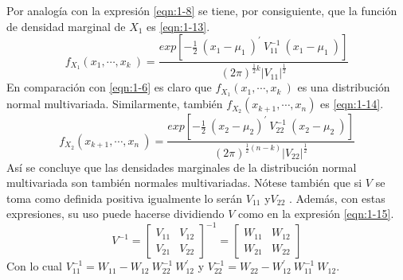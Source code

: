 Por analogía con la expresión \ref{eqn:1-8} se tiene, por consiguiente, que la función de densidad marginal de   $X_1$ es  \ref{eqn:1-13}.
\begin{equation}
f_{X_1}(x_1,\cdots,x_k\ )=\frac{exp[-\frac{1}{2}\ (x_1-\mu_1\ )^\prime\ V_{11}^{-1}\ (x_1-\mu_1\ )]}{(2\pi)^{\frac{1}{2} k} |V_{11} |^{\frac{1}{2}} }
    \label{eqn:1-13}
\end{equation}
En comparación con \ref{eqn:1-6} es claro que $f_{X_1} (x_1,\cdots,x_k\ )$  es una distribución normal multivariada. Similarmente, también $f_{X_2 } (x_{k+1},\cdots,x_{n} )$  es \ref{eqn:1-14}.
\begin{equation}
f_{X_2}(x_{k+1},\cdots,x_n\ )=\frac{exp[-\frac{1}{2}\ (x_2-\mu_2)^\prime\ V_{22}^{-1}\ (x_2-\mu_2\ )]}{(2\pi)^{\frac{1}{2} (n-k)} |V_{22} |^{\frac{1}{2}} }
    \label{eqn:1-14}
\end{equation}
Así se concluye que las densidades marginales de la distribución normal multivariada son también normales multivariadas.  Nótese también que si  $V$ se toma como definida positiva igualmente lo serán  $V_{11}$ y$V_{22}$  . Además, con estas expresiones, su uso puede hacerse dividiendo  $V$ como en la expresión \ref{eqn:1-15}.
\begin{equation}
    V^{-1}=\begin{bmatrix}
V_{11} & V_{12}\\
V_{21} & V_{22} 
\end{bmatrix}^{-1}=\begin{bmatrix}
W_{11} & W_{12}\\
W_{21} & W_{22} 
\end{bmatrix}
\label{eqn:1-15}
\end{equation}
Con lo cual $V_{11}^{-1}=W_{11}-W_{12}\ W_{22}^{-1}\ W_{12}^\prime$   y  $V_{22}^{-1}=W_{22}-W_{12}^\prime\ W_{11}^{-1}\ W_{12}$.
